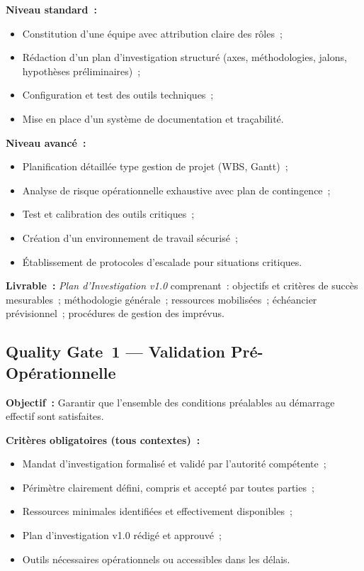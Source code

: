 \textbf{Niveau standard~:}
\begin{itemize}
    \item Constitution d'une équipe avec attribution claire des rôles~;
    \item Rédaction d'un plan d'investigation structuré (axes, méthodologies,
          jalons, hypothèses préliminaires)~;
    \item Configuration et test des outils techniques~;
    \item Mise en place d'un système de documentation et traçabilité.
\end{itemize}

\textbf{Niveau avancé~:}
\begin{itemize}
    \item Planification détaillée type gestion de projet (WBS, Gantt)~;
    \item Analyse de risque opérationnelle exhaustive avec plan de contingence~;
    \item Test et calibration des outils critiques~;
    \item Création d'un environnement de travail sécurisé~;
    \item Établissement de protocoles d'escalade pour situations critiques.
\end{itemize}

\textbf{Livrable~:} \textit{Plan d'Investigation v1.0} comprenant~: objectifs
et critères de succès mesurables~; méthodologie générale~; ressources mobilisées~;
échéancier prévisionnel~; procédures de gestion des imprévus.

\subsection{Quality Gate~1 --- Validation Pré-Opérationnelle}

\textbf{Objectif~:} Garantir que l'ensemble des conditions préalables au démarrage
effectif sont satisfaites.

\textbf{Critères obligatoires (tous contextes)~:}
\begin{itemize}
    \item Mandat d'investigation formalisé et validé par l'autorité compétente~;
    \item Périmètre clairement défini, compris et accepté par toutes parties~;
    \item Ressources minimales identifiées et effectivement disponibles~;
    \item Plan d'investigation v1.0 rédigé et approuvé~;
    \item Outils nécessaires opérationnels ou accessibles dans les délais.
\end{itemize}

